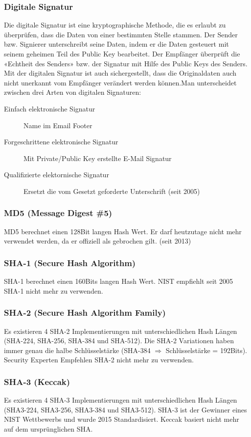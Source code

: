 \subsubsection{Digitale Signatur}
Die digitale Signatur ist eine kryptographische Methode, die es erlaubt zu überprüfen, dass die Daten von einer bestimmten Stelle stammen. Der Sender bzw. Signierer unterschreibt seine Daten, indem er die Daten gesteuert mit seinem geheimen Teil des Public Key bearbeitet. Der Empfänger überprüft die «Echtheit des Senders» bzw. der Signatur mit Hilfe des Public Keys des Senders. Mit der digitalen Signatur ist auch sichergestellt, dass die Originaldaten auch nicht unerkannt vom Empfänger verändert werden können.Man unterscheidet zwischen drei Arten von digitalen Signaturen:
\begin{description}
	\item[Einfach elektronische Signatur] Name im Email Footer
	\item[Forgeschrittene elektronische Signatur] Mit Private/Public Key erstellte E-Mail Signatur
	\item[Qualifizierte elektornische Signatur] Ersetzt die vom Gesetzt geforderte Unterschrift (seit 2005)
\end{description}

\subsubsection{MD5 (Message Digest \#5)}
MD5 berechnet einen 128Bit langen Hash Wert. Er darf heutzutage nicht mehr verwendet werden, da er offiziell als gebrochen gilt. (seit 2013)

\subsubsection{SHA-1 (Secure Hash Algorithm)}
SHA-1 berechnet einen 160Bits langen Hash Wert. NIST empfiehlt seit 2005 SHA-1 nicht mehr zu verwenden. 

\subsubsection{SHA-2 (Secure Hash Algorithm Family)}
Es existieren 4 SHA-2 Implementierungen mit unterschiedlichen Hash Längen (SHA-224, SHA-256, SHA-384 und SHA-512). Die SHA-2 Variationen haben immer genau die halbe Schlüsselstärke (SHA-384 $\Rightarrow$ Schlüsselstärke = 192Bits). Security Experten Empfehlen SHA-2 nicht mehr zu verwenden.

\subsubsection{SHA-3 (Keccak)}
Es existieren 4 SHA-3 Implementierungen mit unterschiedlichen Hash Längen (SHA3-224, SHA3-256, SHA3-384 und SHA3-512). SHA-3 ist der Gewinner eines NIST Wettbewerbs und wurde 2015 Standardisiert. Keccak basiert nicht mehr auf dem ursprünglichen SHA.

